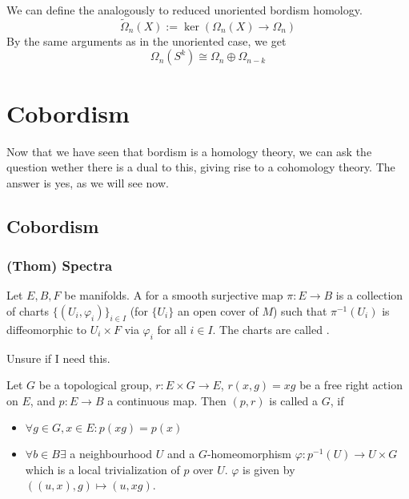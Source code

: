 \documentclass[a4paper,11pt]{article}
\begin{document}
We can define the  analogously to reduced unoriented bordism homology.
\[\tilde\Omega_n(X):=\ker(\Omega_n(X)\to\Omega_n)\]
By the same arguments as in the unoriented case, we get 
\[\Omega_n(S^k)\cong\Omega_n\oplus\Omega_{n-k}\]


\section{Cobordism}
Now that we have seen that bordism is a homology theory, we can ask the question wether there is a dual to this, giving rise to a cohomology theory. The answer is yes, as we will see now.\\

\subsection{Cobordism}

\subsubsection{(Thom) Spectra}

\begin{definition}
    Let \(E,B,F\) be manifolds. A  for a smooth surjective map \(\pi:E\to B\) is a collection of charts \(\{(U_i,\varphi_i)\}_{i\in I}\) (for \(\{U_i\}\) an open cover of \(M\)) such that \(\pi^{-1}(U_i)\) is diffeomorphic to \(U_i\times F\) via \(\varphi_i\) for all \(i\in I\). The charts are called .
\end{definition}

Unsure if I need this.



\begin{definition}
    Let \(G\) be a topological group, \(r:E\times G\to E\), \(r(x,g)=xg\) be a free right action on \(E\), and \(p:E\to B\) a continuous map. Then \((p,r)\) is called a \(G\), if 
    \begin{itemize}
        \item \(\forall g\in G, x\in E: p(xg)=p(x)\)
        \item \(\forall b\in B\exists\) a neighbourhood \(U\) and a \(G\)-homeomorphism \(\varphi:p^{-1}(U)\to U\times G\) which is a local trivialization of \(p\) over \(U\). \(\varphi\) is given by \(((u,x),g)\mapsto (u,xg)\).
    \end{itemize}
\end{definition}
\end{document}
